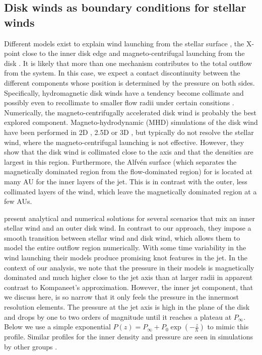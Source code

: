 \subsection{Disk winds as boundary conditions for stellar winds}
\label{sect:boundary}
Different models exist to explain wind launching from the stellar surface \citep{1988ApJ...332L..41K,2005ApJ...632L.135M}, the X-point close to the inner disk edge \citep{1994ApJ...429..781S} and magneto-centrifugal launching from the disk \citep{1982MNRAS.199..883B,2005ApJ...630..945A}. It is likely that more than one mechanism contributes to the total outflow from the system. In this case, we expect a contact discontinuity between the different components whose position is determined by the pressure on both sides. Specifically, hydromagnetic disk winds have a tendency become collimate and possibly even to recollimate to smaller flow radii under certain consitions \citep{http://adsabs.harvard.edu/abs/1982MNRAS.199..883B,http://adsabs.harvard.edu/abs/1992ApJ...394..117P}.
Numerically, the magneto-centrifugally accelerated disk wind is probably the best explored component. Magneto-hydrodynamic (MHD) simulations of the disk wind have been performed in 2D \citep[e.g.][]{2005ApJ...630..945A}, 2.5D \citep[e.g.][]{2011ApJ...728L..11R} or 3D \citep[e.g.][]{2006ApJ...653L..33A}, but typically do not resolve the stellar wind, where the magneto-centrifugal launching is not effective. However, they show that the disk wind is collimated close to the axis and that the densities are largest in this region. Furthermore, the Alfv\'en surface (which separates the magnetically dominated region from the flow-dominated region) for is located at many AU for the inner layers of the jet. This is in contrast with the outer, less collimated layers of the wind, which leave the magnetically dominated region at a few AUs.

\citet{2009A&A...502..217M} present analytical and numerical solutions for several scenarios that mix an inner stellar wind and an outer disk wind. In contrast to our approach, they impose a smooth transition between stellar wind and disk wind, which allows them to model the entire outflow region numerically. With some time variability in the wind launching their models produce promising knot features in the jet. In the context of our analysis, we note that the pressure in their models is magnetically dominated and much higher close to the jet axis than at larger radii in apparent contrast to Kompaneet's approximation. However, the inner jet component, that we discuss here, is so narrow that it only feels the pressure in the innermost resolution elements. The pressure at the jet axis is high in the plane of the disk and drops by one to two orders of magnitude until it reaches a plateau at $P_\infty$. Below we use a simple exponential $P(z)=P_\infty+P_0\exp\left(-\frac{z}{h}\right)$ to mimic this profile.
Similar profiles for the inner density and pressure are seen in simulations by other groups \citep[e.g.][]{2005ApJ...630..945A,Li_Krasnopolsky_Blandford_2006,2008ApJ...678.1109M}.

